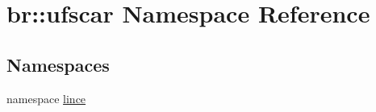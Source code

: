 \hypertarget{namespacebr_1_1ufscar}{
\section{br::ufscar Namespace Reference}
\label{namespacebr_1_1ufscar}
}
\subsection*{Namespaces}
\begin{DoxyCompactItemize}
\item 
namespace \hyperlink{namespacebr_1_1ufscar_1_1lince}{lince}
\end{DoxyCompactItemize}
